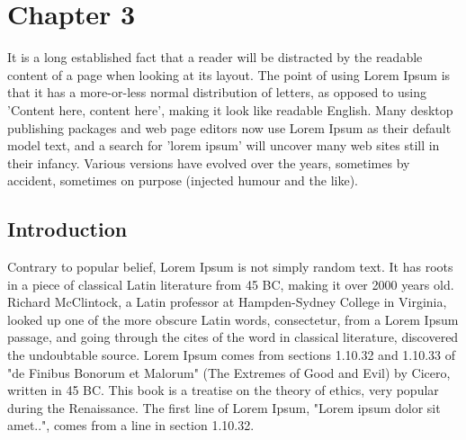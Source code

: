 \chapter{Chapter 3}
\addtocounter{footnote}{-1}  %
\thispagestyle{noheadrule}
\markboth{}{}
\label{ch:chapter3}
\pgfmathsetmacro\chapclr{\colourarray[3]}
\hypersetup{
citecolor  = \chapclr,
linkcolor  = \chapclr,
urlcolor   = \chapclr,
}


\begin{center}
    \begin{minipage}{\abstractwidth\textwidth}
      \begin{small}
        It is a long established fact that a reader will be distracted by the readable content of a page when looking at its layout.
        The point of using Lorem Ipsum is that it has a more-or-less normal distribution of letters, as opposed to using 'Content here, content here', making it look like readable English.
        Many desktop publishing packages and web page editors now use Lorem Ipsum as their default model text, and a search for 'lorem ipsum' will uncover many web sites still in their infancy.
        Various versions have evolved over the years, sometimes by accident, sometimes on purpose (injected humour and the like).
      \end{small}
    \end{minipage}
    \vspace{0.5cm}
\end{center}
\clearpage

\section{Introduction}

  Contrary to popular belief, Lorem Ipsum is not simply random text.
  It has roots in a piece of classical Latin literature from 45 BC, making it over 2000 years old.
  Richard McClintock, a Latin professor at Hampden-Sydney College in Virginia, looked up one of the more obscure Latin words, consectetur, from a Lorem Ipsum passage, and going through the cites of the word in classical literature, discovered the undoubtable source.
  Lorem Ipsum comes from sections 1.10.32 and 1.10.33 of "de Finibus Bonorum et Malorum" (The Extremes of Good and Evil) by Cicero, written in 45 BC.
  This book is a treatise on the theory of ethics, very popular during the Renaissance. The first line of Lorem Ipsum, "Lorem ipsum dolor sit amet..", comes from a line in section 1.10.32.

